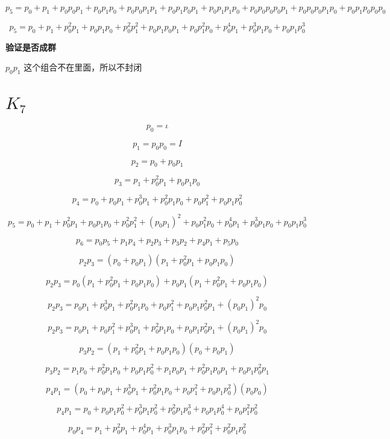 \documentclass[a4paper,12pt]{article}
\numberwithin{definition}{section}
\numberwithin{lemma}{section}
\numberwithin{proposition}{section}
\numberwithin{theorem}{section}
\numberwithin{grammar}{section}
\numberwithin{program}{section}
\numberwithin{convention}{section}
\numberwithin{corollary}{section}
\numberwithin{principle}{section}
\begin{document}
$$p_5 = p_0 + p_1 + p_0 p_0 p_1 + p_0 p_1 p_0 + p_0 p_0 p_1 p_1 + p_0 p_1 p_0 p_1 + p_0 p_1 p_1 p_0 + p_0 p_0 p_0 p_0 p_1 + p_0 p_0 p_0 p_1 p_0 + p_0 p_1 p_0 p_0 p_0$$

$$p_5 = p_0 + p_1 + p_0^2 p_1 + p_0 p_1 p_0 + p_0^2 p_1^2 + p_0 p_1 p_0 p_1 + p_0 p_1^2 p_0 + p_0^4 p_1 + p_0^3 p_1 p_0 + p_0 p_1 p_0^3$$

\textbf{验证是否成群}

$p_0 p_1$ 这个组合不在里面，所以不封闭

\section{$K_7$}

$$p_0 = {\iota} $$

$$p_1 = p_0 p_0 = {I}$$

$$p_2 = p_0 + p_0 p_1$$

$$p_3 = p_1 + p_0^2 p_1 + p_0 p_1 p_0$$

$$p_4 = p_0 + p_0 p_1 + p_0^3 p_1 + p_0^2 p_1 p_0 + p_0 p_1^2 + p_0 p_1 p_0^2$$

$$p_5 = p_0 + p_1 + p_0^2 p_1 + p_0 p_1 p_0 + p_0^2 p_1^2 + (p_0 p_1)^2 + p_0 p_1^2 p_0 + p_0^4 p_1 + p_0^3 p_1 p_0 + p_0 p_1 p_0^3$$

$$p_6 = p_0 p_5 + p_1 p_4 + p_2 p_3 + p_3 p_2 + p_4 p_1 + p_5 p_0$$

$$p_2 p_3 = (p_0 + p_0 p_1) (p_1 + p_0^2 p_1 + p_0 p_1 p_0)$$

$$p_2 p_3 = p_0 (p_1 + p_0^2 p_1 + p_0 p_1 p_0) + p_0 p_1 (p_1 + p_0^2 p_1 + p_0 p_1 p_0)$$

$$p_2 p_3 =  p_0 p_1 + p_0^3 p_1 + p_0^2 p_1 p_0 + p_0 p_1^2 + p_0 p_1 p_0^2 p_1 + (p_0 p_1)^2 p_0$$

$$p_2 p_3 =  p_0 p_1 + p_0 p_1^2 + p_0^3 p_1 + p_0^2 p_1 p_0 + p_0 p_1 p_0^2 p_1 + (p_0 p_1)^2 p_0$$

$$p_3 p_2 = (p_1 + p_0^2 p_1 + p_0 p_1 p_0) (p_0 + p_0 p_1)$$

$$p_3 p_2 = p_1 p_0 + p_0^2 p_1 p_0 + p_0 p_1 p_0^2 + p_1 p_0 p_1 + p_0^2 p_1 p_0 p_1 + p_0 p_1 p_0^2 p_1 $$

$$p_4 p_1 = (p_0 + p_0 p_1 + p_0^3 p_1 + p_0^2 p_1 p_0 + p_0 p_1^2 + p_0 p_1 p_0^2) (p_0 p_0)$$

$$p_4 p_1 = p_0 + p_0 p_1 p_0^2 + p_0^3 p_1 p_0^2 + p_0^2 p_1 p_0^3 + p_0 p_1 p_0^4 + p_0 p_1^2 p_0^2$$

$$p_0 p_4 = p_1 + p_0^2 p_1 + p_0^4 p_1 + p_0^3 p_1 p_0 + p_0^2 p_1^2 + p_0^2 p_1 p_0^2 $$
\end{document}
